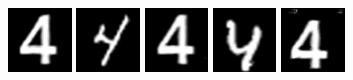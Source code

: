 \begin{figure}
{\begin{minipage}[t]{0.45\textwidth}
        \includegraphics[width=0.15\textwidth]{fig/experiment_mnist/4-2.png}
        \includegraphics[width=0.15\textwidth]{fig/experiment_mnist/4-5.png}
        \includegraphics[width=0.15\textwidth]{fig/experiment_mnist/4-6.png}
        \includegraphics[width=0.15\textwidth]{fig/experiment_mnist/4-7.png}
        \includegraphics[width=0.15\textwidth]{fig/experiment_mnist/4-8.png}
    \end{minipage}
    }
\end{figure}
